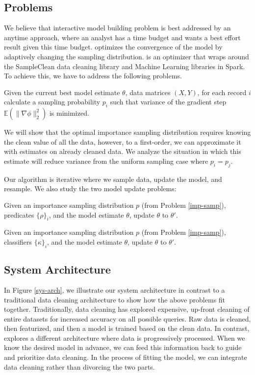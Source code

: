 \subsection{Problems}
We believe that interactive model building problem is best addressed by an anytime approach, where an analyst has a time budget and wants a best effort result given this time budget.
\sys optimizes the convergence of the model by adaptively changing the sampling distribution.
\sys is an optimizer that wraps around the SampleClean data cleaning library and Machine Learning libraries in Spark.
To achieve this, we have to address the following problems.

\begin{problem}\label{imp-samp}\sloppy
Given the current best model estimate $\theta$, data matrices $(X,Y)$, for each record $i$ calculate a sampling probability $p_i$ such that variance of the gradient step $\mathbb{E}(\|\nabla\phi\|_{2}^{2})$ is minimized.
\end{problem}

We will show that the optimal importance sampling distribution requires knowing the clean value of all the data, however, to a first-order, we can approximate it with estimates on already cleaned data.
We analyze the situation in which this estimate will reduce variance from the uniform sampling case where $p_i = p_j$.

Our algorithm is iterative where we sample data, update the model, and resample.
We also study the two model update problems:
\begin{problem}
Given an importance sampling distribution $p$ (from Problem \ref{imp-samp}), predicates $\{\rho\}_i$, and the model estimate $\theta$, update $\theta$ to $\theta'$.
\end{problem}

\begin{problem}
Given an importance sampling distribution $p$ (from Problem \ref{imp-samp}), classifiers $\{\kappa\}_i$, and the model estimate $\theta$, update $\theta$ to $\theta'$.
\end{problem}

\subsection{System Architecture}
In Figure \ref{sys-arch}, we illustrate our system architecture in contrast to a traditional data cleaning architecture to show how the above problems fit together.
Traditionally, data cleaning has explored expensive, up-front cleaning of entire datasets for increased accuracy on all possible queries.
Raw data is cleaned, then featurized, and then a model is trained based on the clean data.
In contrast, \sys explores a different architecture where data is progressively processed.
When we know the desired model in advance, we can feed this information back to guide and prioritize data cleaning.
In the process of fitting the model, we can integrate data cleaning rather than divorcing the two parts.

